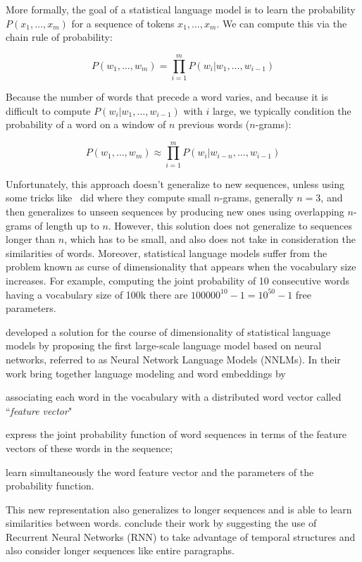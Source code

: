 More formally, the goal of a statistical language model is to learn the probability $P(x_1, \dots, x_m)$ for a sequence of tokens $x_1, \dots, x_m$. We can compute this via the chain rule of probability:

\begin{equation}
P\left(w_{1}, \ldots, w_{m}\right)=\prod_{i=1}^{m} P\left(w_{i} | w_{1}, \dots, w_{i-1}\right)
\end{equation}

Because the number of words that precede a word varies, and because it is difficult to compute $P(w_i | w_1,\dots, w_{i-1})$ with $i$ large, we typically condition the probability of a word on a window of $n$ previous words ($n$-grams): 


\begin{equation}
P\left(w_{1}, \ldots, w_{m}\right) \approx \prod_{i=1}^{m} P\left(w_{i} | w_{i-n}, \dots, w_{i-1}\right)
\end{equation}

Unfortunately, this approach doesn't generalize to new sequences, unless using some tricks like~\citet{katz1987probablm} did where they compute small $n$-grams, generally $n=3$, and then generalizes to unseen sequences by producing new ones using overlapping $n$-grams of length up to $n$. However, this solution does not generalize to sequences longer than $n$, which has to be small, and also does not take in consideration the similarities of words. Moreover, statistical language models suffer from the problem known as curse of dimensionality that appears when the vocabulary size increases. For example, computing the joint probability of 10 consecutive words having a vocabulary size of 100k there are $100000^{10} - 1 = 10^{50} - 1$ free parameters. 

\citet{bengio2000nnlm} developed a solution for the course of dimensionality of statistical language models by proposing the first large-scale language model based on neural networks, referred to as Neural Network Language Models (NNLMs). In their work \citet{bengio2000nnlm} bring together language modeling and word embeddings by \begin {enumerate*} [1) ]
\item associating each word in the vocabulary with a distributed word vector called ``\textit{feature vector}" \item express the joint probability function of word sequences in terms of the feature vectors of these words in the sequence; \item learn simultaneously the word feature vector and the parameters of the probability function.
\end {enumerate*} This new representation also generalizes to longer sequences and is able to learn similarities between words. \citet{bengio2000nnlm} conclude their work by suggesting the use of Recurrent Neural Networks (RNN) to take advantage of temporal structures and also consider longer sequences like entire paragraphs.

